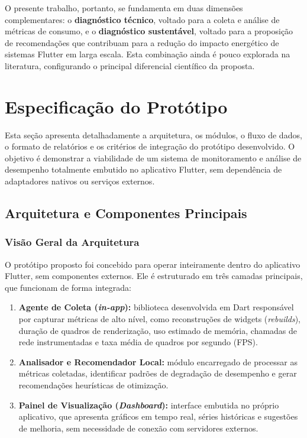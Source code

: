 \documentclass[12pt,a4paper,oneside]{abntex2}
\begin{document}
O presente trabalho, portanto, se fundamenta em duas dimensões complementares: o \textbf{diagnóstico técnico}, voltado para a coleta e análise de métricas de consumo, e o \textbf{diagnóstico sustentável}, voltado para a proposição de recomendações que contribuam para a redução do impacto energético de sistemas Flutter em larga escala.  
Esta combinação ainda é pouco explorada na literatura, configurando o principal diferencial científico da proposta.
\chapter{Especificação do Protótipo}

Esta seção apresenta detalhadamente a arquitetura, os módulos, o fluxo de dados, o formato de relatórios e os critérios de integração do protótipo desenvolvido. O objetivo é demonstrar a viabilidade de um sistema de monitoramento e análise de desempenho totalmente embutido no aplicativo Flutter, sem dependência de adaptadores nativos ou serviços externos.

\section{Arquitetura e Componentes Principais}

\subsection{Visão Geral da Arquitetura}

O protótipo proposto foi concebido para operar inteiramente dentro do aplicativo Flutter, sem componentes externos. Ele é estruturado em três camadas principais, que funcionam de forma integrada:

\begin{enumerate}
  \item \textbf{Agente de Coleta (\textit{in-app}):} biblioteca desenvolvida em Dart responsável por capturar métricas de alto nível, como reconstruções de widgets (\textit{rebuilds}), duração de quadros de renderização, uso estimado de memória, chamadas de rede instrumentadas e taxa média de quadros por segundo (FPS). 

  \item \textbf{Analisador e Recomendador Local:} módulo encarregado de processar as métricas coletadas, identificar padrões de degradação de desempenho e gerar recomendações heurísticas de otimização.

  \item \textbf{Painel de Visualização (\textit{Dashboard}):} interface embutida no próprio aplicativo, que apresenta gráficos em tempo real, séries históricas e sugestões de melhoria, sem necessidade de conexão com servidores externos.
\end{enumerate}
\end{document}
